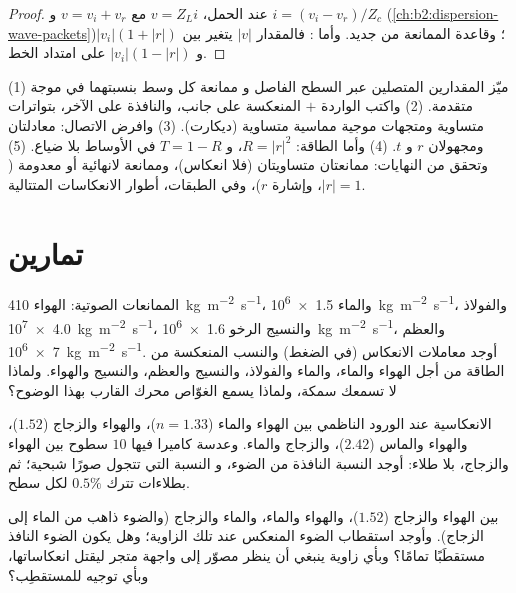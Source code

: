 \begin{proof}
عند الحمل، $v = Z_Li$ مع $v = v_i + v_r$ و $i = (v_i - v_r)/Z_c$
(\cref{ch:b2:dispersion-wave-packets})؛ وقاعدة الممانعة من جديد.
وأما : فالمقدار $|v|$ يتغير بين $|v_i|(1 + |r|)$ و $|v_i|(1 -
|r|)$ على امتداد الخط.
\end{proof}

\begin{method}\label{met:b2:wave-interfaces:method}
(1) ميّز المقدارين المتصلين عبر السطح الفاصل و
ممانعة كل وسط بنسبتهما في موجة متقدمة.
(2) واكتب الواردة $+$ المنعكسة على جانب، والنافذة على الآخر،
بتواترات متساوية ومتجهات موجية مماسية متساوية (ديكارت).
(3) وافرض الاتصال: معادلتان ومجهولان $r$ و $t$. (4) وأما الطاقة:
$R = |r|^2$، و $T = 1 - R$ في الأوساط بلا ضياع. (5) وتحقق من النهايات: ممانعتان
متساويتان (فلا انعكاس)، وممانعة لانهائية أو معدومة ($|r| = 1$، وإشارة
$r$)، وفي الطبقات، أطوار الانعكاسات المتتالية.
\end{method}

\section{تمارين}

\begin{exercise}[$\star$]\label{exo:b2:wave-interfaces:1}
الممانعات الصوتية: الهواء \qty{410}{kg.m^{-2}.s^{-1}}، والماء \qty{1.5e6}{kg.m^{-2}.s^{-1}}،
والفولاذ \qty{4.0e7}{kg.m^{-2}.s^{-1}}، والنسيج الرخو \qty{1.6e6}{kg.m^{-2}.s^{-1}}، والعظم
\qty{7e6}{kg.m^{-2}.s^{-1}}. أوجد معاملات الانعكاس (في الضغط) والنسب
المنعكسة من الطاقة من أجل الهواء والماء، والماء والفولاذ، والنسيج والعظم،
والنسيج والهواء. ولماذا لا تسمعك سمكة، ولماذا يسمع الغوّاص
محرك القارب بهذا الوضوح؟
\end{exercise}

\begin{exercise}[$\star$]\label{exo:b2:wave-interfaces:2}
الانعكاسية عند الورود الناظمي بين الهواء والماء ($n = 1.33$)، والهواء والزجاج
($1.52$)، والهواء والماس ($2.42$)، والزجاج والماء. وعدسة كاميرا فيها $10$
سطوح بين الهواء والزجاج، بلا طلاء: أوجد النسبة النافذة من الضوء، و
النسبة التي تتجول صورًا شبحية؛ ثم بطلاءات تترك
$0.5\%$ لكل سطح.
\end{exercise}

\begin{exercise}[$\star$]\label{exo:b2:wave-interfaces:3}
 بين الهواء والزجاج ($1.52$)، والهواء والماء، والماء والزجاج
(والضوء ذاهب من الماء إلى الزجاج). وأوجد استقطاب الضوء المنعكس
عند تلك الزاوية؛ وهل يكون الضوء النافذ مستقطَبًا تمامًا؟ وبأي
زاوية ينبغي أن ينظر مصوّر إلى واجهة متجر ليقتل
انعكاساتها، وبأي توجيه للمستقطِب؟
\end{exercise}


